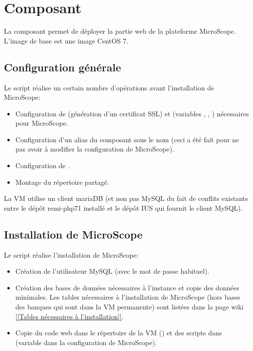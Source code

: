 \section{Composant }\label{frontend}

La composant  permet de déployer la partie web de la plateforme MicroScope.
L'image de base est une image CentOS 7.

\subsection{Configuration générale}

Le script  réalise un certain nombre d'opérations avant l'installation de MicroScope:
\begin{itemize}
    \item Configuration de  (génération d'un certificat SSL)
          et  (variables , ,  )
          nécessaires pour MicroScope.
    \item Configuration d'un alias du composant  sous le nom 
          (ceci a été fait pour ne pas avoir à modifier la configuration de MicroScope).
    \item Configuration de .
    \item Montage du répertoire partagé.
\end{itemize}

\begin{warningbox}
    La VM  utilise un client mariaDB (et non pas MySQL du fait de conflits existants entre le dépôt remi-php71 installé et le dépôt IUS qui fournit le client MySQL).
\end{warningbox}

\subsection{Installation de MicroScope}

Le script  réalise l'installation de MicroScope:
\begin{itemize}
    \item Création de l'utilisateur MySQL  (avec le mot de passe habituel).
    \item Création des bases de données nécessaires à l'instance et copie des données minimales.
          Les tables nécessaires à l'installation de MicroScope (hors bases des banques qui sont dans la VM permanente)
          sont listées dans la page wiki \href{https://intranet.genoscope.cns.fr/agc/redmine/projects/microcloud/wiki/Tables_necessaires_a_installation}{[[Tables nécessaires à l'installation]]}.
    \item Copie du code web dans le répertoire  de la VM ()
          et des scripts dans  (variable  dans la configuration de MicroScope).
\end{itemize}

